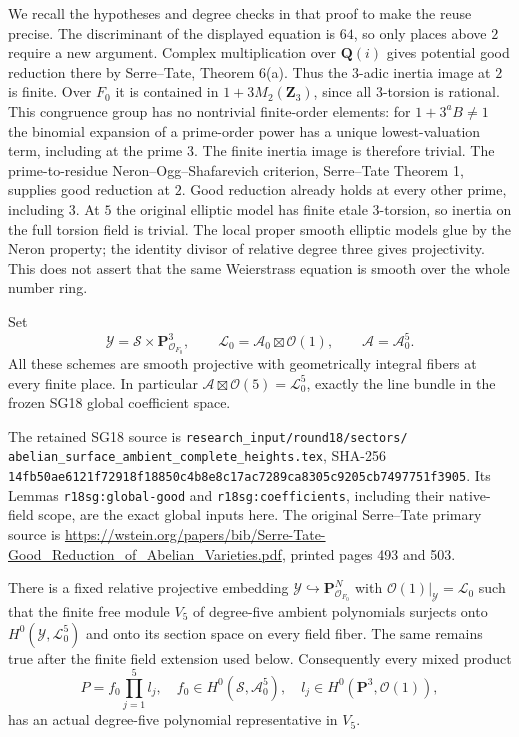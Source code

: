 We recall the hypotheses and degree checks in that proof to make
the reuse precise.  The discriminant of the displayed equation is
$64$, so only places above $2$ require a new argument.  Complex
multiplication over $\mathbf Q(i)$ gives potential good reduction
there by Serre--Tate, Theorem 6(a).  Thus the $3$-adic inertia image
at $2$ is finite.  Over $F_0$ it is contained in
$1+3M_2(\mathbf Z_3)$, since all $3$-torsion is rational.
This congruence group has no nontrivial finite-order elements:
for $1+3^aB\ne1$ the binomial expansion of a prime-order power
has a unique lowest-valuation term, including at the prime $3$.
The finite inertia image is therefore trivial.  The prime-to-residue
Neron--Ogg--Shafarevich criterion, Serre--Tate Theorem 1, supplies
good reduction at $2$.  Good reduction already holds at every other
prime, including $3$.  At $5$ the original elliptic model has finite
etale $3$-torsion, so inertia on the full torsion field is trivial.
The local proper smooth elliptic models glue by the Neron property;
the identity divisor of relative degree three gives projectivity.
This does not assert that the same Weierstrass equation is smooth
over the whole number ring.

Set
\[
  \mathcal Y=\mathcal S\times\mathbf P^3_{\mathcal O_{F_0}},
  \qquad \mathcal L_0=\mathcal A_0\boxtimes\mathcal O(1),
  \qquad \mathcal A=\mathcal A_0^5.
 \tag{MG21.2}\label{r21mg:ambient}
\]
All these schemes are smooth projective with geometrically integral
fibers at every finite place.  In particular
$\mathcal A\boxtimes\mathcal O(5)=\mathcal L_0^5$, exactly the
line bundle in the frozen SG18 global coefficient space.

The retained SG18 source is
\texttt{research\_input/round18/sectors/}
\texttt{abelian\_surface\_ambient\_complete\_heights.tex},
SHA-256
\texttt{14fb50ae6121f72918f18850c4b8e8c17ac7289ca8305c9205cb7497751f3905}.
Its Lemmas \texttt{r18sg:global-good} and
\texttt{r18sg:coefficients}, including their native-field scope,
are the exact global inputs here.  The original Serre--Tate primary
source is
\url{https://wstein.org/papers/bib/Serre-Tate-Good_Reduction_of_Abelian_Varieties.pdf},
printed pages 493 and 503.

\begin{lemma}
\label{r21mg:coefficients}
There is a fixed relative projective embedding
$\mathcal Y\hookrightarrow\mathbf P^N_{\mathcal O_{F_0}}$ with
$\mathcal O(1)|_{\mathcal Y}=\mathcal L_0$ such that the finite free
module $V_5$ of degree-five ambient polynomials surjects onto
$H^0(\mathcal Y,\mathcal L_0^5)$ and onto its section space on
every field fiber.  The same remains true after the finite field
extension used below.  Consequently every mixed product
\[
       P=f_0\prod_{j=1}^5l_j,
       \quad f_0\in H^0(\mathcal S,\mathcal A_0^5),
       \quad l_j\in H^0(\mathbf P^3,\mathcal O(1)),
 \tag{MG21.3}\label{r21mg:P}
\]
has an actual degree-five polynomial representative in $V_5$.
\end{lemma}

